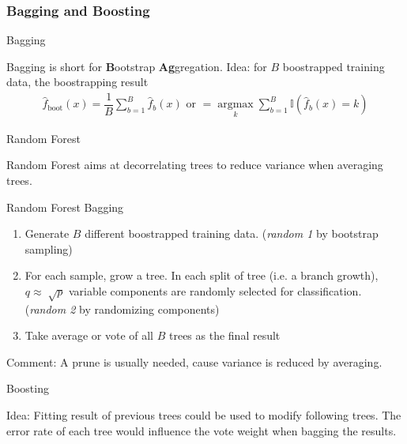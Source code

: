\subsubsection{Bagging and Boosting}
    
\begin{point}
    Bagging
\end{point}

    Bagging is short for \textbf{B}ootstrap \textbf{Ag}gregation. Idea: for $ B $ boostrapped training data, the boostrapping result
    \begin{align}
        \hat{f}_\mathrm{boot}(x)=\dfrac{1}{B}\sum_{b=1}^B\hat{f}_b(x)  \text{ or }=\mathop{\arg\max}\limits_{k} \sum_{b=1}^B\mathbb{I}(\hat{f}_b(x)=k)
    \end{align}

\begin{point}
    Random Forest
\end{point}

    Random Forest aims at decorrelating trees to reduce variance when averaging trees.

\begin{algorithm}{Random Forest Bagging}
    \begin{enumerate}[topsep=2pt,itemsep=2pt]
        \item Generate $ B $ different boostrapped training data. (\textit{random 1} by bootstrap sampling)
        \item For each sample, grow a tree. In each split of tree (i.e. a branch growth), $ q\approx \sqrt[]{p} $ variable components are randomly selected for classification. (\textit{random 2} by randomizing components)
        \item Take average or vote of all $ B $ trees as the final result
    \end{enumerate}
    
    Comment: A prune is usually needed, cause variance is reduced by averaging.
        
\end{algorithm}
    
\begin{point}
    Boosting
\end{point}

    Idea: Fitting result of previous trees could be used to modify following trees. The error rate of each tree would influence the vote weight when bagging the results.

